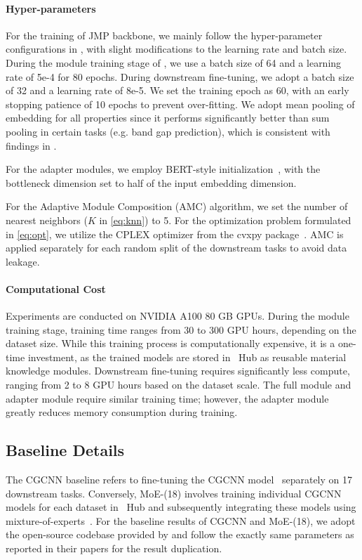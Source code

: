 \paragraph{Hyper-parameters}
For the training of JMP backbone, we mainly follow the hyper-parameter configurations in \citet{shoghi2023molecules}, with slight modifications to the learning rate and batch size.
During the module training stage of \name, we use a batch size of 64 and a learning rate of 5e-4 for 80 epochs.
During downstream fine-tuning, we adopt a batch size of 32 and a learning rate of 8e-5. We set the training epoch as 60, with an early stopping patience of 10 epochs to prevent over-fitting.
We adopt mean pooling of embedding for all properties since it performs significantly better than sum pooling in certain tasks (e.g. band gap prediction), which is consistent with findings in \citet{shoghi2023molecules}.

For the adapter modules, we employ BERT-style initialization~\citep{devlin2018bert}, with the bottleneck dimension set to half of the input embedding dimension.

For the Adaptive Module Composition (AMC) algorithm, we set the number of nearest neighbors ($K$ in \cref{eq:knn}) to 5. For the optimization problem formulated in \cref{eq:opt}, we utilize the CPLEX optimizer from the cvxpy package~\citep{cvxpy}.
AMC is applied separately for each random split of the downstream tasks to avoid data leakage.

\paragraph{Computational Cost}
Experiments are conducted on NVIDIA A100 80 GB GPUs. During the module training stage, training time ranges from 30 to 300 GPU hours, depending on the dataset size.
While this training process is computationally expensive, it is a one-time investment, as the trained models are stored in \name \ Hub as reusable material knowledge modules.
Downstream fine-tuning requires significantly less compute, ranging from 2 to 8 GPU hours based on the dataset scale. The full module and adapter module require similar training time; however, the adapter module greatly reduces memory consumption during training.


\subsection{Baseline Details}
\label{appendix:baselines}
The CGCNN baseline refers to fine-tuning the CGCNN model~\citep{xie2018crystal} separately on 17 downstream tasks. Conversely, MoE-(18) involves training individual CGCNN models for each dataset in \name \ Hub and subsequently integrating these models using mixture-of-experts~\citep{jacobs1991adaptive,shazeer2016outrageously}.
For the baseline results of CGCNN and MoE-(18), we adopt the open-source codebase provided by \citet{chang2022towards} and follow the exactly same parameters as reported in their papers for the result duplication.

